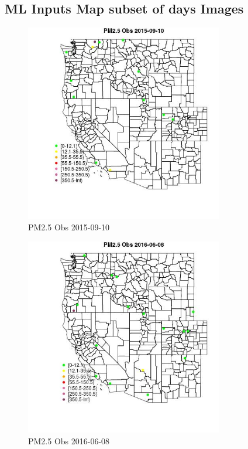 
\subsection{ML Inputs Map subset of days Images} 
 

\begin{figure} 
\centering  
\includegraphics[width=0.77\textwidth]{Code_Outputs/Report_ML_input_PM25_Step4_part_e_de_duplicated_aves_MapObsPM25_Obs2015-09-10.jpg} 
\caption{\label{fig:Report_ML_input_PM25_Step4_part_e_de_duplicated_avesMapObsPM25_Obs2015-09-10}PM2.5 Obs 2015-09-10} 
\end{figure} 
 

\begin{figure} 
\centering  
\includegraphics[width=0.77\textwidth]{Code_Outputs/Report_ML_input_PM25_Step4_part_e_de_duplicated_aves_MapObsPM25_Obs2016-06-08.jpg} 
\caption{\label{fig:Report_ML_input_PM25_Step4_part_e_de_duplicated_avesMapObsPM25_Obs2016-06-08}PM2.5 Obs 2016-06-08} 
\end{figure} 
 

